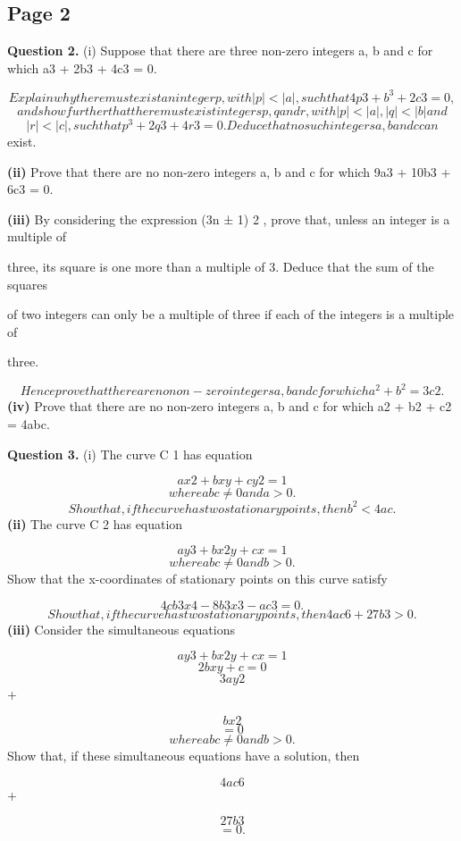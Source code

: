 \documentclass[12pt]{article}
\begin{document}
\subsection*{Page 2}
\begin{flushleft}
\bigskip\textbf{Question 2.} (i) Suppose that there are three non-zero integers a, b and c for which a3 + 2b3 + 4c3 = 0.\par
\[Explain why there must exist an integer p, with |p| < |a|, such that 4p3 + b^3 + 2c3 = 0,\]
\[and show further that there must exist integers p, q and r, with |p| < |a|, |q| < |b| and\]
\[|r| < |c|, such that p^3 + 2q3 + 4r3 = 0. Deduce that no such integers a, b and c can\]
exist.\par
\textbf{(ii)} Prove that there are no non-zero integers a, b and c for which 9a3 + 10b3 + 6c3 = 0.\par
\textbf{(iii)} By considering the expression (3n ± 1) 2 , prove that, unless an integer is a multiple of\par
three, its square is one more than a multiple of 3. Deduce that the sum of the squares\par
of two integers can only be a multiple of three if each of the integers is a multiple of\par
three.\par
\[Hence prove that there are no non-zero integers a, b and c for which a^2 + b^2 = 3c2 .\]
\textbf{(iv)} Prove that there are no non-zero integers a, b and c for which a2 + b2 + c2 = 4abc.\par
\bigskip\textbf{Question 3.} (i) The curve C 1 has equation\par
\[ax2 + bxy + cy2 = 1\]
\[where abc \ne 0 and a > 0.\]
\[Show that, if the curve has two stationary points, then b^2 < 4ac .\]
\textbf{(ii)} The curve C 2 has equation\par
\[ay3 + bx2y + cx = 1\]
\[where abc \ne 0 and b > 0.\]
Show that the x-coordinates of stationary points on this curve satisfy\par
\[4cb3x4 - 8b3x3 - ac3 = 0 .\]
\[Show that, if the curve has two stationary points, then 4ac6 + 27b3 > 0 .\]
\textbf{(iii)} Consider the simultaneous equations\par
\[ay3 + bx2y + cx = 1\]
\[2bxy + c = 0\]
\[3ay2\]
+\par
\[bx2\]
\[= 0\]
\[where abc \ne 0 and b > 0 .\]
Show that, if these simultaneous equations have a solution, then\par
\[4ac6\]
+\par
\[27b3\]
\[= 0 .\]
\end{flushleft}
\end{document}
